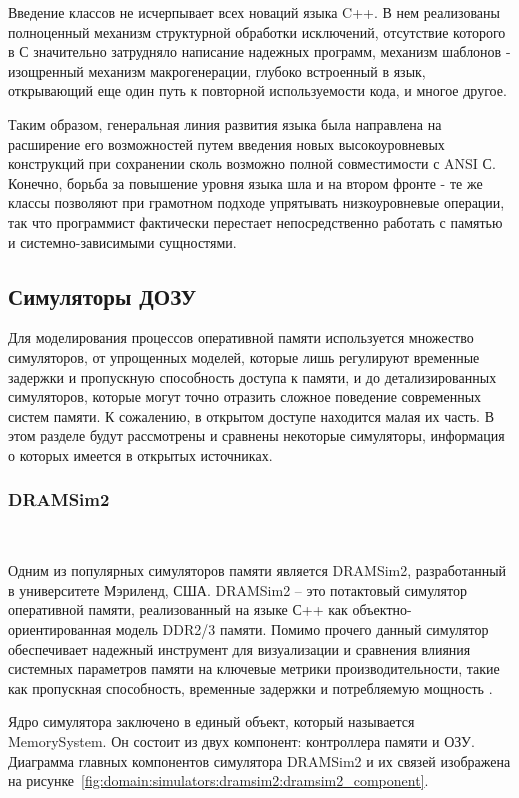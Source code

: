 Введение классов не исчерпывает всех новаций языка C++. В нем реализованы полноценный механизм структурной обработки исключений, отсутствие которого в С значительно затрудняло написание надежных программ, механизм шаблонов - изощренный механизм макрогенерации, глубоко встроенный в язык, открывающий еще один путь к повторной используемости кода, и многое другое.

Таким образом, генеральная линия развития языка была направлена на расширение его возможностей путем введения новых высокоуровневых конструкций при сохранении сколь возможно полной совместимости с ANSI С. Конечно, борьба за повышение уровня языка шла и на втором фронте - те же классы позволяют при грамотном подходе упрятывать низкоуровневые операции, так что программист фактически перестает непосредственно работать с памятью и системно-зависимыми сущностями.

\subsection{Симуляторы ДОЗУ}
\label{sub:domain:simulators}

Для моделирования процессов оперативной памяти используется множество симуляторов, от упрощенных моделей, которые лишь регулируют временные задержки и пропускную способность доступа к памяти, и до детализированных симуляторов, которые могут точно отразить сложное поведение современных систем памяти. К сожалению, в открытом доступе находится малая их часть. В этом разделе будут рассмотрены и сравнены некоторые симуляторы, информация о которых имеется в открытых источниках.

\subsubsection{DRAMSim2}~\\
\label{sub:domain:simulators:dramsim2}

Одним из популярных симуляторов памяти является DRAMSim2, разработанный в университете Мэриленд, США. 
DRAMSim2 – это потактовый симулятор оперативной памяти, реализованный на языке С++ как объектно-ориентированная модель DDR2/3 памяти. Помимо прочего данный симулятор обеспечивает надежный инструмент для визуализации и сравнения влияния системных параметров памяти на ключевые метрики производительности, такие как пропускная способность, временные задержки и потребляемую мощность \cite{dramsim2_article}.

Ядро симулятора заключено в единый объект, который называется MemorySystem. Он состоит из двух компонент: контроллера памяти и ОЗУ. Диаграмма главных компонентов симулятора DRAMSim2 и их связей изображена на рисунке~\ref{fig:domain:simulators:dramsim2:dramsim2_component}. 

